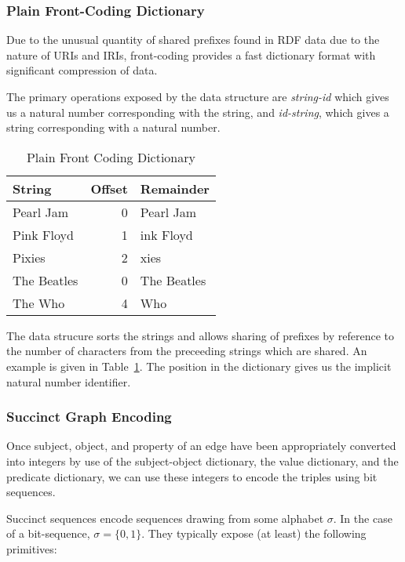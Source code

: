\documentclass[10pt, a4paper, twocolumn]{article} %
\begin{document}
\subsubsection{Plain Front-Coding Dictionary}

Due to the unusual quantity of shared prefixes found in RDF data due
to the nature of URIs and IRIs, front-coding provides a fast
dictionary format with significant compression of
data\autocite{MARTINEZPRIETO201673}.

The primary operations exposed by the data structure are {\em
  string-id} which gives us a natural number corresponding with the
string, and {\em id-string}, which gives a string corresponding with a
natural number.

\begin{table}
	\centering
	\begin{tabular}{l|rl}
		\toprule
		String & Offset & Remainder \\
		\midrule
        Pearl Jam & 0 & Pearl Jam \\
        Pink Floyd & 1 & ink Floyd \\
        Pixies & 2 & xies \\
		The Beatles & 0 & The Beatles \\
		The Who & 4 & Who \\
		\bottomrule
	\end{tabular}
    \caption{Plain Front Coding Dictionary}
    \label{tab:pfc}
\end{table}

The data strucure sorts the strings and allows sharing of prefixes by
reference to the number of characters from the preceeding strings
which are shared. An example is given in Table~\ref{tab:pfc}. The
position in the dictionary gives us the implicit natural number
identifier.

\subsubsection{Succinct Graph Encoding}

Once subject, object, and property of an edge have been appropriately
converted into integers by use of the subject-object dictionary, the
value dictionary, and the predicate dictionary, we can use these
integers to encode the triples using bit sequences.

Succinct sequences encode sequences drawing from some alphabet
\(\sigma\). In the case of a bit-sequence, \(\sigma=\{0,1\}\). They
typically expose (at least) the following primitives:
\end{document}
